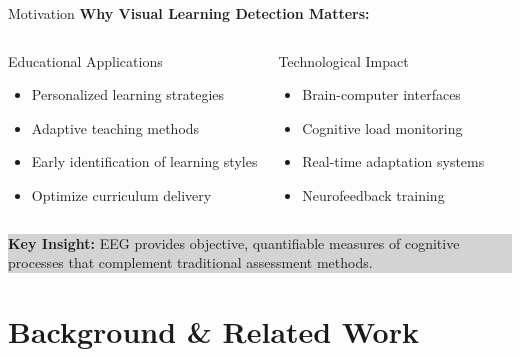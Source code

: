 \documentclass[aspectratio=169]{beamer}
\begin{document}
\begin{frame}{Motivation}
\textbf{Why Visual Learning Detection Matters:}

\begin{columns}[c]
\begin{block}{Educational Applications}
\begin{itemize}
    \item Personalized learning strategies
    \item Adaptive teaching methods
    \item Early identification of learning styles
    \item Optimize curriculum delivery
\end{itemize}
\end{block}

\begin{block}{Technological Impact}
\begin{itemize}
    \item Brain-computer interfaces
    \item Cognitive load monitoring
    \item Real-time adaptation systems
    \item Neurofeedback training
\end{itemize}
\end{block}
\end{columns}

\vspace{5mm}

\begin{center}
\colorbox{lightgray}{\parbox{0.9\textwidth}{
\centering
\textbf{Key Insight:} EEG provides objective, quantifiable measures of cognitive processes that complement traditional assessment methods.
}}
\end{center}
\end{frame}

\section{Background \& Related Work}
\end{document}
